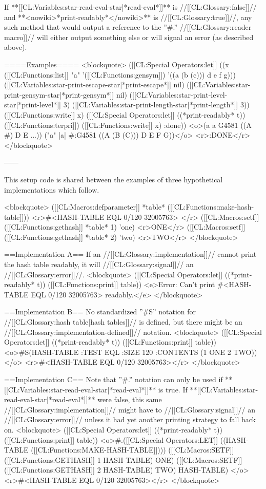 If **[[CL:Variables:star-read-eval-star|*read-eval*]]** is //[[CL:Glossary:false]]// and **<nowiki>*print-readably*</nowiki>** is //[[CL:Glossary:true]]//, any such method that would output a reference to the ''#.'' //[[CL:Glossary:reader macro]]// will either output something else or will signal an error (as described above).

====Examples====
<blockquote> 
([[CL:Special Operators:let]] ((x ([[CL:Functions:list]] "a" '\a ([[CL:Functions:gensym]]) '((a (b (c))) d e f g))) 
      ([[CL:Variables:star-print-escape-star|*print-escape*]] nil) 
      ([[CL:Variables:star-print-gensym-star|*print-gensym*]] nil)
      ([[CL:Variables:star-print-level-star|*print-level*]] 3) 
      ([[CL:Variables:star-print-length-star|*print-length*]] 3))
  ([[CL:Functions:write]] x) 
  ([[CL:Special Operators:let]] ((*print-readably* t)) 
    ([[CL:Functions:terpri]]) 
    ([[CL:Functions:write]] x) 
    :done))
<o>(a a G4581 ((A #) D E ...))
("a" |a| #:G4581 ((A (B (C))) D E F G))</o> 
<r>:DONE</r>
</blockquote>

------

This setup code is shared between the examples of three hypothetical implementations which follow. 

<blockquote>
([[CL:Macros:defparameter]] *table* ([[CL:Functions:make-hash-table]])) <r>#<HASH-TABLE EQL 0/120 32005763> </r>
([[CL:Macros:setf]] ([[CL:Functions:gethash]] *table* 1) 'one) <r>ONE</r>
([[CL:Macros:setf]] ([[CL:Functions:gethash]] *table* 2) 'two) <r>TWO</r>
</blockquote>

==Implementation A==
If an //[[CL:Glossary:implementation]]// cannot print the hash table readably, it will //[[CL:Glossary:signal]]// an //[[CL:Glossary:error]]//.
<blockquote>
([[CL:Special Operators:let]] ((*print-readably* t))
  ([[CL:Functions:print]] table))
<e>Error: Can't print #<HASH-TABLE EQL 0/120 32005763> readably.</e>
</blockquote>

==Implementation B==
No standardized ''#S'' notation for //[[CL:Glossary:hash table|hash tables]]// is defined, but there might be an //[[CL:Glossary:implementation-defined]]// notation.
<blockquote>
([[CL:Special Operators:let]] ((*print-readably* t))
  ([[CL:Functions:print]] table))
<o>#S(HASH-TABLE :TEST EQL :SIZE 120 :CONTENTS (1 ONE 2 TWO)) </o>
<r>#<HASH-TABLE EQL 0/120 32005763></r>
</blockquote>

==Implementation C==
Note that ''#.'' notation can only be used if **[[CL:Variables:star-read-eval-star|*read-eval*]]** is true. If **[[CL:Variables:star-read-eval-star|*read-eval*]]** were false, this same //[[CL:Glossary:implementation]]// might have to //[[CL:Glossary:signal]]// an //[[CL:Glossary:error]]// unless it had yet another printing strategy to fall back on. 
<blockquote>
([[CL:Special Operators:let]] ((*print-readably* t))
  ([[CL:Functions:print]] table))
<o>#.([[CL:Special Operators:LET]] ((HASH-TABLE ([[CL:Functions:MAKE-HASH-TABLE]])))
    ([[CL:Macros:SETF]] ([[CL:Functions:GETHASH]] 1 HASH-TABLE) ONE)
    ([[CL:Macros:SETF]] ([[CL:Functions:GETHASH]] 2 HASH-TABLE) TWO)
    HASH-TABLE) </o>
<r>#<HASH-TABLE EQL 0/120 32005763></r>
</blockquote>

